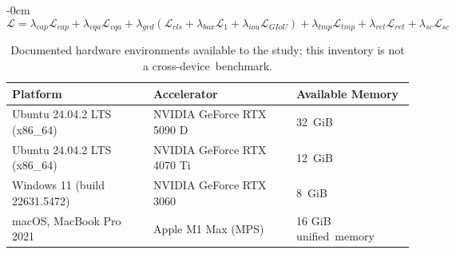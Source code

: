 \documentclass[applsci,article,accept,moreauthors]{Definitions/mdpi}
\begin{document}
\begin{adjustwidth}{-\extralength}{0cm}
\begin{equation}
\mathcal{L} = \lambda_{cap}\mathcal{L}_{cap} + \lambda_{vqa}\mathcal{L}_{vqa} + \lambda_{grd}\left(\mathcal{L}_{cls} + \lambda_{box}\mathcal{L}_{1} + \lambda_{iou}\mathcal{L}_{GIoU}\right) + \lambda_{tmp}\mathcal{L}_{tmp} + \lambda_{ret}\mathcal{L}_{ret} + \lambda_{sc}\mathcal{L}_{sc}
\label{eq21}
\end{equation}
\end{adjustwidth}

\begin{table}[H]
\caption{Documented hardware environments available to the study; this inventory is not a cross-device~benchmark.\label{tab2}}
\small
\begin{tabularx}{\textwidth}{m{4.8cm}<{\raggedright}m{4.2cm}<{\raggedright}L}
\toprule
\textbf{Platform} & \textbf{Accelerator} & \textbf{Available Memory} \\
\midrule
Ubuntu 24.04.2 LTS (x86\_64) & NVIDIA GeForce RTX 5090 D & 32~GiB \\
Ubuntu 24.04.2 LTS (x86\_64) & NVIDIA GeForce RTX 4070 Ti & 12~GiB \\
Windows 11 (build 22631.5472) & NVIDIA GeForce RTX 3060 & 8~GiB \\
macOS, MacBook Pro 2021 & Apple M1 Max (MPS) & 16 GiB unified~memory \\
\bottomrule
\end{tabularx}
\end{table}
\vspace{-10pt}
\end{document}

